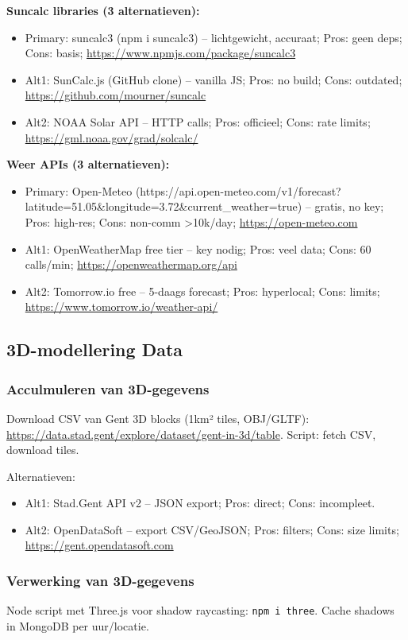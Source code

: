 \documentclass{article}
\begin{document}
\textbf{Suncalc libraries (3 alternatieven):}
\begin{itemize}
    \item Primary: suncalc3 (npm i suncalc3) -- lichtgewicht, accuraat; Pros: geen deps; Cons: basis; \url{https://www.npmjs.com/package/suncalc3}\cite{web:10}
    \item Alt1: SunCalc.js (GitHub clone) -- vanilla JS; Pros: no build; Cons: outdated; \url{https://github.com/mourner/suncalc}
    \item Alt2: NOAA Solar API -- HTTP calls; Pros: officieel; Cons: rate limits; \url{https://gml.noaa.gov/grad/solcalc/}
\end{itemize}

\textbf{Weer APIs (3 alternatieven):}
\begin{itemize}
    \item Primary: Open-Meteo (https://api.open-meteo.com/v1/forecast?latitude=51.05&longitude=3.72\&current_weather=true) -- gratis, no key; Pros: high-res; Cons: non-comm >10k/day; \url{https://open-meteo.com}\cite{web:16}
    \item Alt1: OpenWeatherMap free tier -- key nodig; Pros: veel data; Cons: 60 calls/min; \url{https://openweathermap.org/api}
    \item Alt2: Tomorrow.io free -- 5-daags forecast; Pros: hyperlocal; Cons: limits; \url{https://www.tomorrow.io/weather-api/}\cite{web:21}
\end{itemize}

\subsection{3D-modellering Data}
\subsubsection{Acculmuleren van 3D-gegevens}
Download CSV van Gent 3D blocks (1km² tiles, OBJ/GLTF): \url{https://data.stad.gent/explore/dataset/gent-in-3d/table}\cite{web:1}. Script: fetch CSV, download tiles.

Alternatieven:
\begin{itemize}
    \item Alt1: Stad.Gent API v2 -- JSON export; Pros: direct; Cons: incompleet.
    \item Alt2: OpenDataSoft -- export CSV/GeoJSON; Pros: filters; Cons: size limits; \url{https://gent.opendatasoft.com}
\end{itemize}

\subsubsection{Verwerking van 3D-gegevens}
Node script met Three.js voor shadow raycasting: \texttt{npm i three}. Cache shadows in MongoDB per uur/locatie.
\end{document}
